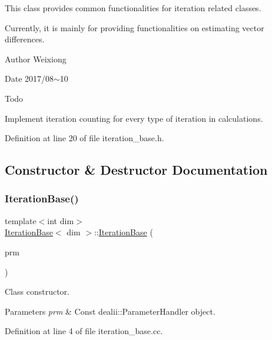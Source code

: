 This class provides common functionalities for iteration related classes. 

Currently, it is mainly for providing functionalities on estimating vector differences.

\begin{DoxyAuthor}{Author}
Weixiong 
\end{DoxyAuthor}
\begin{DoxyDate}{Date}
2017/08$\sim$10 
\end{DoxyDate}
\begin{DoxyRefDesc}{Todo}
\item[\hyperlink{todo__todo000004}{Todo}]Implement iteration counting for every type of iteration in calculations. \end{DoxyRefDesc}


Definition at line 20 of file iteration\+\_\+base.\+h.



\subsection{Constructor \& Destructor Documentation}
\mbox{\label{class_iteration_base_a385009434fcdf512953f317088e09b0b}} 
\subsubsection{\texorpdfstring{Iteration\+Base()}{IterationBase()}}
{\footnotesize\ttfamily template$<$int dim$>$ \\
\hyperlink{class_iteration_base}{Iteration\+Base}$<$ dim $>$\+::\hyperlink{class_iteration_base}{Iteration\+Base} (\begin{DoxyParamCaption}\item[{const Parameter\+Handler \&}]{prm }\end{DoxyParamCaption})}

Class constructor.


\begin{DoxyParams}{Parameters}
{\em prm} & Const dealii\+::\+Parameter\+Handler object. \\
\hline
\end{DoxyParams}


Definition at line 4 of file iteration\+\_\+base.\+cc.

\mbox{\label{class_iteration_base_a942860f3a03d46da883c1c6c430bea55}} 
